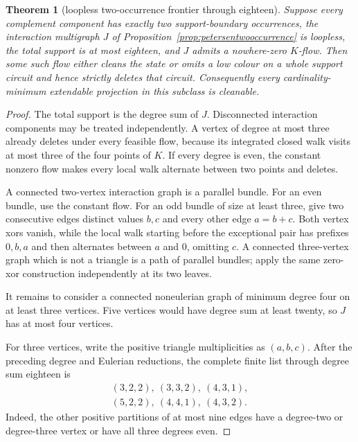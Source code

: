 \documentclass[11pt]{article}
\newtheorem{theorem}{Theorem}[section]
\theoremstyle{definition}
\theoremstyle{remark}
\begin{document}
\begin{theorem}[loopless two-occurrence frontier through eighteen]
\label{thm:twooccurrenceeighteen}
Suppose every complement component has exactly two support-boundary
occurrences, the interaction multigraph \(J\) of
Proposition~\ref{prop:petersentwooccurrence} is loopless, the total
support is at most eighteen, and \(J\) admits a nowhere-zero \(K\)-flow.
Then some such flow either cleans the state or omits a low colour on a
whole support circuit and hence strictly deletes that circuit.
Consequently every cardinality-minimum extendable projection in this
subclass is cleanable.
\end{theorem}

\begin{proof}
The total support is the degree sum of \(J\).  Disconnected interaction
components may be treated independently.  A vertex of degree at most
three already deletes under every feasible flow, because its integrated
closed walk visits at most three of the four points of \(K\).  If every
degree is even, the constant nonzero flow makes every local walk
alternate between two points and deletes.

A connected two-vertex interaction graph is a parallel bundle.  For an
even bundle, use the constant flow.  For an odd bundle of size at least
three, give two consecutive edges distinct values \(b,c\) and every
other edge \(a=b+c\).  Both vertex xors vanish, while the local walk
starting before the exceptional pair has prefixes \(0,b,a\) and then
alternates between \(a\) and \(0\), omitting \(c\).  A connected
three-vertex graph which is not a triangle is a path of parallel bundles;
apply the same zero-xor construction independently at its two leaves.

It remains to consider a connected noneulerian graph of minimum degree
four on at least three vertices.  Five vertices would have degree sum at
least twenty, so \(J\) has at most four vertices.

For three vertices, write the positive triangle multiplicities as
\((a,b,c)\).  After the preceding degree and Eulerian reductions, the
complete finite list through degree sum eighteen is
\[
\begin{gathered}
 (3,2,2),\ (3,3,2),\ (4,3,1),\\
 (5,2,2),\ (4,4,1),\ (4,3,2).
\end{gathered}                                             \tag{26m}\label{eq:twoocc-triangles}
\]
Indeed, the other positive partitions of at most nine edges have a
degree-two or degree-three vertex or have all three degrees even.


\end{proof}
\end{document}
